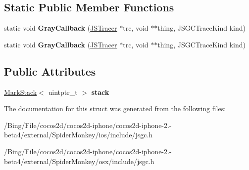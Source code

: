 \subsection*{Static Public Member Functions}
\begin{DoxyCompactItemize}
\item 
\hypertarget{structjs_1_1_g_c_marker_a148b39464664a9492e47d1d68631a03e}{static void {\bfseries Gray\-Callback} (\hyperlink{struct_j_s_tracer}{J\-S\-Tracer} $\ast$trc, void $\ast$$\ast$thing, J\-S\-G\-C\-Trace\-Kind kind)}\label{structjs_1_1_g_c_marker_a148b39464664a9492e47d1d68631a03e}

\item 
\hypertarget{structjs_1_1_g_c_marker_a148b39464664a9492e47d1d68631a03e}{static void {\bfseries Gray\-Callback} (\hyperlink{struct_j_s_tracer}{J\-S\-Tracer} $\ast$trc, void $\ast$$\ast$thing, J\-S\-G\-C\-Trace\-Kind kind)}\label{structjs_1_1_g_c_marker_a148b39464664a9492e47d1d68631a03e}

\end{DoxyCompactItemize}
\subsection*{Public Attributes}
\begin{DoxyCompactItemize}
\item 
\hypertarget{structjs_1_1_g_c_marker_a32beaa1b84db648a81cd155175edba75}{\hyperlink{structjs_1_1_mark_stack}{Mark\-Stack}$<$ uintptr\-\_\-t $>$ {\bfseries stack}}\label{structjs_1_1_g_c_marker_a32beaa1b84db648a81cd155175edba75}

\end{DoxyCompactItemize}


The documentation for this struct was generated from the following files\-:\begin{DoxyCompactItemize}
\item 
/\-Bing/\-File/cocos2d/cocos2d-\/iphone/cocos2d-\/iphone-\/2.-\/beta4/external/\-Spider\-Monkey/ios/include/jsgc.\-h\item 
/\-Bing/\-File/cocos2d/cocos2d-\/iphone/cocos2d-\/iphone-\/2.-\/beta4/external/\-Spider\-Monkey/osx/include/jsgc.\-h\end{DoxyCompactItemize}
